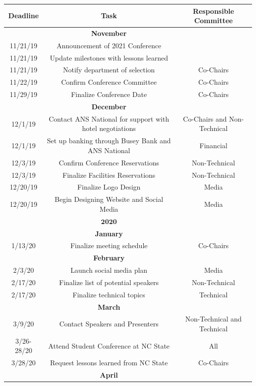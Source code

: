 \begin{center}
\begin{longtable}{c |  c  c}
\hline\hline
\textbf{Deadline} & \textbf{Task} & \textbf{Responsible Committee}\\
\hline\hline

&\textbf{November}&\\
\hline\hline
11/21/19 & Announcement of 2021 Conference & \\
11/21/19 & Update milestones with lessons learned &\\
11/21/19 & Notify department of selection & Co-Chairs\\
11/22/19 & Confirm Conference Committee & Co-Chairs\\
11/29/19 & Finalize Conference Date & Co-Chairs\\
\hline\hline
&\textbf{December}&\\
\hline\hline
12/1/19 & Contact ANS National for support with hotel negotiations& Co-Chairs and Non-Technical\\
12/1/19 & Set up banking through Busey Bank and ANS National& Financial\\
12/3/19 & Confirm Conference Reservations & Non-Technical\\
12/3/19 & Finalize Facilities Reservations& Non-Technical\\
12/20/19 & Finalize Logo Design& Media\\
12/20/19 & Begin Designing Website and Social Media& Media\\
\hline\hline
&$\textbf{2020}$&\\
\hline\hline
&\textbf{January}&\\
\hline\hline
1/13/20 & Finalize meeting schedule& Co-Chairs\\
\hline\hline
&\textbf{February}&\\
\hline\hline
2/3/20 & Launch social media plan& Media\\
2/17/20 & Finalize list of potential speakers& Non-Technical\\
2/17/20 & Finalize technical topics& Technical\\
\hline\hline
&\textbf{March}&\\
\hline\hline
3/9/20 & Contact Speakers and Presenters& Non-Technical and Technical\\
3/26-28/20 & Attend Student Conference at NC State& All\\
3/28/20 & Request lessons learned from NC State& Co-Chairs\\
\hline\hline
&\textbf{April}&\\

\end{longtable}
\end{center}
